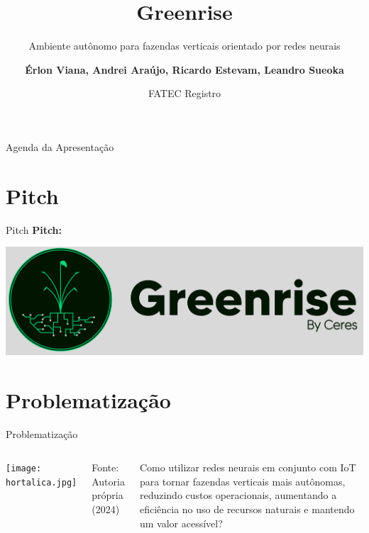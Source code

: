 \documentclass[10pt]{beamer}
\title[Greenrise]{Greenrise}  %
\subtitle{Ambiente autônomo para fazendas verticais orientado por redes neurais}
\author[Seu Nome]{\textbf{Érlon Viana, Andrei Araújo, Ricardo Estevam, Leandro Sueoka}}
\institute[Centro Paula Souza]{Centro Paula Souza}
\date{FATEC Registro}
\begin{document}
\begin{frame}[plain]
  \titlepage
\end{frame}

\begin{frame}{Agenda da Apresentação} 
    \tableofcontents
\end{frame}

\section{Pitch}
\begin{frame}{Pitch}
\centering
{\color{black}\bfseries\LARGE Pitch:}

\vspace{0.5cm}
\includegraphics[width=0.7\linewidth]{LOGOMARCA.png}
\end{frame}

\section{Problematização}
\begin{frame}{Problematização}

\begin{columns}[T,onlytextwidth]
    \centering
    \texttt{[image: hortalica.jpg]}
    
    \vspace{0.1cm}
    {\footnotesize
    \textcolor{cpspreto}{Fonte: Autoria própria (2024)}
    }
    
    \raggedright
    \hspace{0.8cm}\begin{minipage}{0.85\linewidth}
    {\small\textcolor{cpspreto}{Como utilizar redes neurais em conjunto com IoT para tornar fazendas verticais mais autônomas, reduzindo custos operacionais, aumentando a eficiência no uso de recursos naturais e mantendo um valor acessível?}}
    \end{minipage}

\end{columns}

\end{frame}
\end{document}
